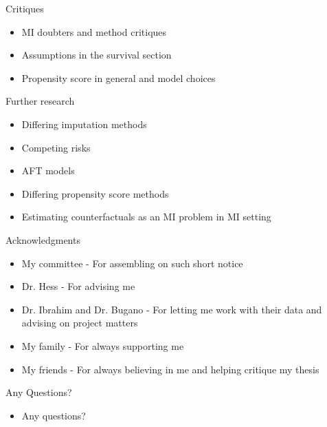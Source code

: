 \begin{frame}{Critiques}
 \begin{itemize}
  \item MI doubters and method critiques
  \item Assumptions in the survival section
  \item Propensity score in general and model choices
 \end{itemize}

\end{frame}


\begin{frame}{Further research}

\begin{itemize}
 \item Differing imputation methods
 \item Competing risks
 \item AFT models
 \item Differing propensity score methods
 \item Estimating counterfactuals as an MI problem in MI setting
 
\end{itemize}

 
\end{frame}

\begin{frame}{Acknowledgments}
 \begin{itemize}
  \item My committee - For assembling on such short notice
  \item Dr. Hess - For advising me 
  \item Dr. Ibrahim and Dr. Bugano - For letting me work with their data and advising
  on project matters
  \item My family - For always supporting me
  \item My friends - For always believing in me and helping critique my thesis
  
 \end{itemize}

\end{frame}

\begin{frame}{Any Questions?}
\begin{itemize}
 \item Any questions?
\end{itemize}
\end{frame}
